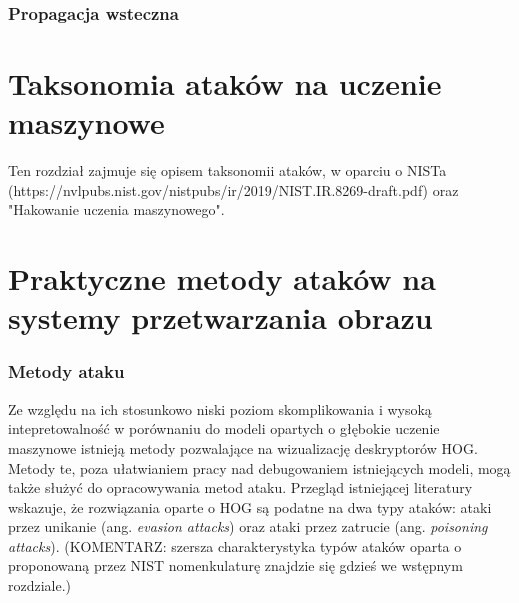 \documentclass[12pt,a4paper,leqno,oneside,titlepage]{book}
\begin{document}


\subsection{Propagacja wsteczna}

%
%
%
%
%
%
%
%
%
%

\chapter{Taksonomia ataków na uczenie maszynowe}

Ten rozdział zajmuje się opisem taksonomii ataków, w oparciu o NISTa (https://nvlpubs.nist.gov/nistpubs/ir/2019/NIST.IR.8269-draft.pdf) oraz "Hakowanie uczenia maszynowego".

%
%
%
%
%
%
%
%
%
%

\chapter{Praktyczne metody ataków na systemy przetwarzania obrazu}


\subsection{Metody ataku}
Ze względu na ich stosunkowo niski poziom skomplikowania i wysoką intepretowalność w porównaniu do modeli opartych o głębokie uczenie maszynowe istnieją metody pozwalające na wizualizację deskryptorów HOG. Metody te, poza ułatwianiem pracy nad debugowaniem istniejących modeli, mogą także służyć do opracowywania metod ataku. Przegląd istniejącej literatury wskazuje, że rozwiązania oparte o HOG są podatne na dwa typy ataków: ataki przez unikanie (ang. \textit{evasion attacks}) oraz ataki przez zatrucie (ang. \textit{poisoning attacks})\cite{Hoggles, MacDonald19}. (KOMENTARZ: szersza charakterystyka typów ataków oparta o proponowaną przez NIST nomenkulaturę znajdzie się gdzieś we wstępnym rozdziale.)
\end{document}
